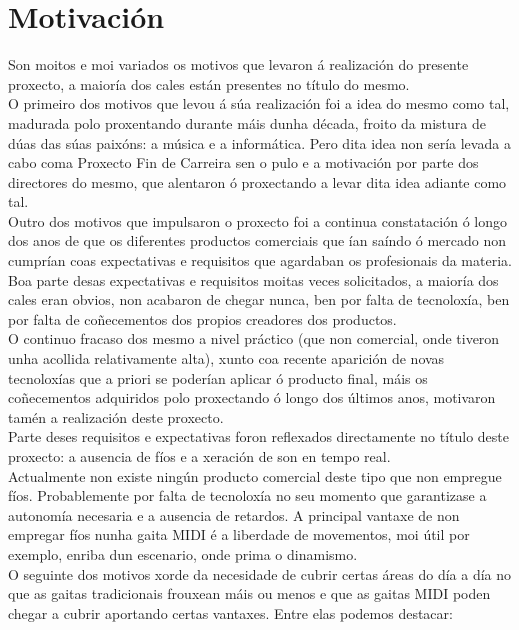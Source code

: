 \section{Motivación}

 Son moitos e moi variados os motivos que levaron á realización do presente
 proxecto, a maioría dos cales están presentes no título do mesmo.\\

 O primeiro dos motivos que levou á súa realización foi a idea do mesmo como
 tal, madurada polo proxentando durante máis dunha década, froito da mistura de
 dúas das súas paixóns: a música e a informática. Pero dita idea non sería
 levada a cabo coma Proxecto Fin de Carreira sen o pulo e a motivación por
 parte dos directores do mesmo, que alentaron ó proxectando a levar dita idea
 adiante como tal. \\

 Outro dos motivos que impulsaron o proxecto foi a continua constatación ó
 longo dos anos de que os diferentes productos comerciais que ían saíndo ó
 mercado non cumprían coas expectativas e requisitos que agardaban os
 profesionais da materia. Boa parte desas expectativas e requisitos moitas
 veces solicitados, a maioría dos cales eran obvios, non acabaron de chegar
 nunca, ben por falta de tecnoloxía, ben por falta de coñecementos dos propios
 creadores dos productos. \\

 O continuo fracaso dos mesmo a nivel práctico (que non comercial, onde tiveron
 unha acollida relativamente alta), xunto coa recente aparición de novas 
 tecnoloxías que a priori se poderían aplicar ó producto final, máis os
 coñecementos adquiridos polo proxectando ó longo dos últimos anos, motivaron
 tamén a realización deste proxecto. \\

 Parte deses requisitos e expectativas foron reflexados directamente no título
 deste proxecto: a ausencia de fíos e a xeración de son en tempo real. \\

 Actualmente non existe ningún producto comercial deste tipo que non empregue
 fíos. Probablemente por falta de tecnoloxía no seu momento que garantizase a
 autonomía necesaria e a ausencia de retardos. A principal vantaxe de non
 empregar fíos nunha gaita MIDI é a liberdade de movementos, moi útil por
 exemplo, enriba dun escenario, onde prima o dinamismo. \\

 O seguinte dos motivos xorde da necesidade de cubrir certas áreas do día a día
 no que as gaitas tradicionais frouxean máis ou menos e que as gaitas MIDI
 poden chegar a cubrir aportando certas vantaxes. Entre elas podemos destacar:

